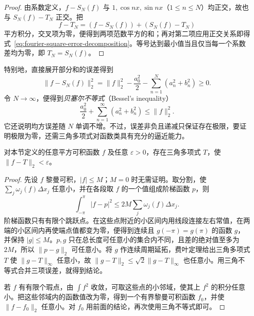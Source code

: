 \begin{proof}
由系数定义，$f-S_N(f)$ 与 $1,\cos nx,\sin nx$（$1\leq n\leq N$）均正交，故也与 $S_N(f)-T_N$ 正交。把
\[
    f-T_N=(f-S_N(f))+(S_N(f)-T_N)
\]
平方积分，交叉项为零，便得到两项范数平方的和；再对第二项应用正交关系即得式~\eqref{eq:fourier-square-error-decomposition}。等号达到最小值当且仅当每一个系数差均为零，即 $T_N=S_N(f)$。
\end{proof}

特别地，直接展开部分和的误差得到
\begin{equation}
    \|f-S_N(f)\|_2^2
       =\|f\|_2^2-\frac{a_0^2}{2}
                          -\sum_{n=1}^N(a_n^2+b_n^2)\geq0.
    \label{eq:fourier-residual-energy}
\end{equation}
令 $N\to\infty$，便得到\emph{贝塞尔不等式}（Bessel's inequality）
\begin{equation}
    \frac{a_0^2}{2}+\sum_{n=1}^\infty(a_n^2+b_n^2)\leq\|f\|_2^2.
    \label{eq:bessel-fourier-inequality}
\end{equation}
它还说明均方误差随 $N$ 单调不增。不过，误差非负且递减只保证存在极限，要证明极限为零，还需三角多项式对函数类具有充分的逼近能力。

\begin{lemma}[平方可积函数的三角多项式逼近]
\label{lem:trigonometric-density-square-integral}
对本节定义的任意平方可积函数 $f$ 及任意 $\varepsilon>0$，存在三角多项式 $T$，使 $\|f-T\|_2<\varepsilon$。
\end{lemma}

\begin{proof}
先设 $f$ 黎曼可积，$|f|\leq M$；$M=0$ 时无需证明。取分割，使 $\sum_j\omega_j(f)\Delta x_j$ 任意小，并在各段取 $f$ 的一个值组成阶梯函数 $p$，则
\[
    \int_{-\pi}^{\pi}|f-p|^2
       \leq2M\sum_j\omega_j(f)\Delta x_j.
\]
阶梯函数只有有限个跳跃点。在这些点附近的小区间内用线段连接左右常值，在两端的小区间内再使端点值都变为零，便得到连续且 $g(-\pi)=g(\pi)$ 的函数 $g$，并保持 $|g|\leq M$。$p,g$ 只在总长度可任意小的集合内不同，且差的绝对值至多为 $2M$，所以 $\|p-g\|_2$ 可任意小。将 $g$ 作连续周期延拓，费叶定理给出三角多项式 $T$ 使 $\|g-T\|_\infty$ 任意小，故 $\|g-T\|_2\leq\sqrt2\|g-T\|_\infty$ 也任意小。用三角不等式合并三项误差，就得到结论。

若 $f$ 有有限个瑕点，由 $\int f^2$ 收敛，可取这些点的小邻域，使其上 $f^2$ 的积分任意小。把这些邻域内的函数值改为零，得到一个有界黎曼可积函数 $f_0$，并使 $\|f-f_0\|_2$ 任意小。对 $f_0$ 用前面的结论，再次使用三角不等式即可。
\end{proof}

